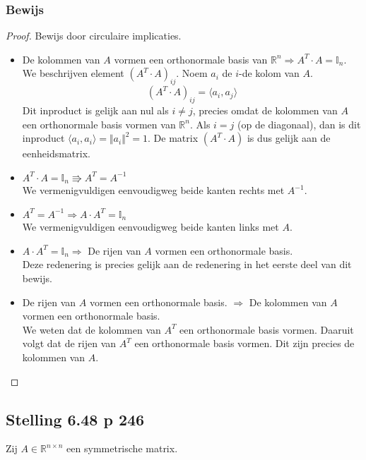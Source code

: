 \documentclass[lineaire_algebra_oplossingen.tex]{subfiles}
\begin{document}
\subsubsection*{Bewijs}
\begin{proof}
Bewijs door circulaire implicaties.
\begin{itemize}
\item
De kolommen van $A$ vormen een orthonormale basis van $\mathbb{R}^n \Rightarrow A^T \cdot A = \mathbb{I}_n$.\\
We beschrijven element $(A^T \cdot A)_{ij}$. Noem $a_i$ de $i$-de kolom van $A$.
\[
(A^T \cdot A)_{ij} = \langle a_i , a_j\rangle
\]
Dit inproduct is gelijk aan nul als $i\neq j$, precies omdat de kolommen van $A$ een orthonormale basis vormen van $\mathbb{R}^n$.
Als $i =j$ (op de diagonaal), dan is dit inproduct $\langle a_i , a_i \rangle = \Vert a_i\Vert^2 = 1$. De matrix $(A^T \cdot A)$ is dus gelijk aan de eenheidsmatrix.

\item
$A^T \cdot A = \mathbb{I}_n \Rrightarrow A^T =A^{-1}$\\
We vermenigvuldigen eenvoudigweg beide kanten rechts met $A^{-1}$.

\item
$A^T =A^{-1} \Rightarrow A \cdot A^T = \mathbb{I}_n$\\
We vermenigvuldigen eenvoudigweg beide kanten links met $A$.

\item
$A \cdot A^T = \mathbb{I}_n \Rightarrow $ De rijen van $A$ vormen een orthonormale basis.\\
Deze redenering is precies gelijk aan de redenering in het eerste deel van dit bewijs.

\item
De rijen van $A$ vormen een orthonormale basis. $\Rightarrow$ De kolommen van $A$ vormen een orthonormale basis.\\
We weten dat de kolommen van $A^T$ een orthonormale basis vormen.
Daaruit volgt dat de rijen van $A^T$ een orthonormale basis vormen.
Dit zijn precies de kolommen van $A$.
\end{itemize}
\end{proof}


\subsection{Stelling 6.48 p 246}
\label{6.48}
Zij $A\in \mathbb{R}^{n\times n}$ een symmetrische matrix.
\end{document}
